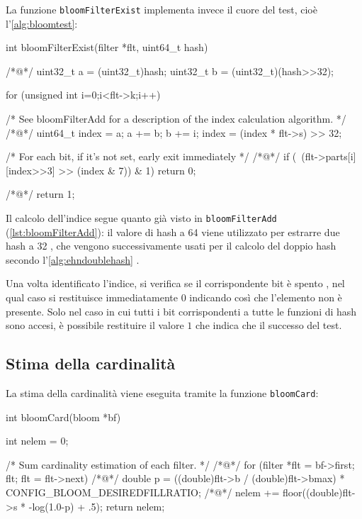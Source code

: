 La funzione \verb|bloomFilterExist| implementa invece il cuore del test, cioè 
l'\autoref{alg:bloomtest}:

\begin{commentedsource}[style=csource,caption=Test di appartenenza di un elemento ad un filtro]
int bloomFilterExist(filter *flt, uint64_t hash) {
/*@\lnote@*/    uint32_t a = (uint32_t)hash;
    uint32_t b = (uint32_t)(hash>>32);

    for (unsigned int i=0;i<flt->k;i++) {
        /* See bloomFilterAdd for a description of the index calculation algorithm. */
/*@\lnote@*/        uint64_t index = a;
        a += b; b += i;
        index = (index * flt->s) >> 32;

        /* For each bit, if it's not set, early exit immediately */
/*@\lnote@*/        if (~(flt->parts[i][index>>3] >> (index & 7)) & 1)
            return 0;
    }
/*@\lnote@*/    return 1;
}
\end{commentedsource}

Il calcolo dell'indice segue quanto già visto in \verb|bloomFilterAdd|
(\autoref{lst:bloomFilterAdd}): il valore di hash a \SI{64}{\bit} viene utilizzato per estrarre due
hash a \SI{32}{\bit} , che vengono successivamente usati per il calcolo del doppio hash
secondo l'\autoref{alg:ehndoublehash} .

Una volta identificato l'indice, si verifica se il corrispondente bit è spento , nel qual
caso si restituisce immediatamente $0$ indicando così che l'elemento non è presente. Solo nel caso
in cui tutti i bit corrispondenti a tutte le funzioni di hash sono accesi, è possibile restituire il
valore $1$  che indica che il successo del test.

\subsection{Stima della cardinalità}
\label{sec:patch:card}

La stima della cardinalità viene eseguita tramite la funzione \verb|bloomCard|:

\begin{commentedsource}[style=csource,caption=Stima della cardinalità]
int bloomCard(bloom *bf) {
    int nelem = 0;

    /* Sum cardinality estimation of each filter. */
/*@\lnote@*/    for (filter *flt = bf->first; flt; flt = flt->next) {
/*@\lnote@*/        double p = ((double)flt->b / (double)flt->bmax) * CONFIG_BLOOM_DESIREDFILLRATIO;
/*@\lnote@*/        nelem += floor((double)flt->s * -log(1.0-p) + .5);
    }
    return nelem;
}
\end{commentedsource}

